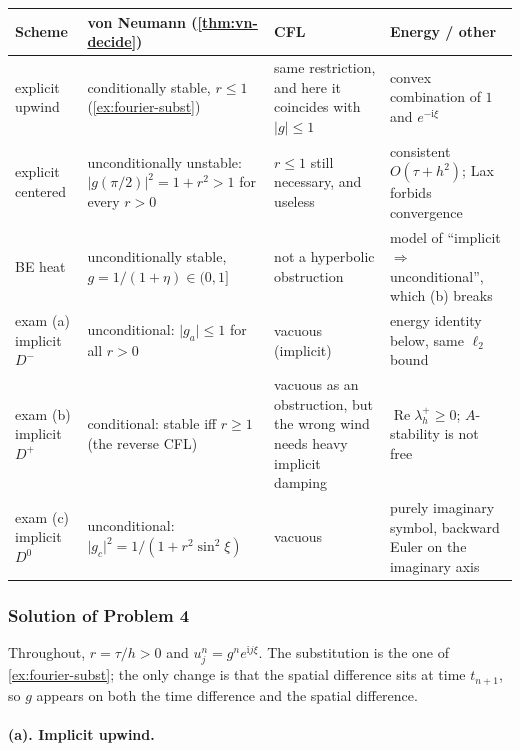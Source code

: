 \documentclass[11pt,a4paper]{article}
\begin{document}
{\footnotesize
\begin{center}
\begin{tabular}{@{}>{\raggedright\arraybackslash}p{3.3cm}
                   >{\raggedright\arraybackslash}p{3.7cm}
                   >{\raggedright\arraybackslash}p{3.5cm}
                   >{\raggedright\arraybackslash}p{3.3cm}@{}}
\toprule
Scheme & von Neumann (\cref{thm:vn-decide}) & CFL & Energy / other \\
\midrule
explicit upwind
&
conditionally stable, \(r\le 1\)
(\cref{ex:fourier-subst})
&
same restriction, and here it coincides with \(\lvert g\rvert\le 1\)
&
convex combination of \(1\) and \(e^{-\mathrm i\xi}\)
\\
explicit centered
&
unconditionally unstable: \(\lvert g(\pi/2)\rvert^2=1+r^2>1\) for every \(r>0\)
&
\(r\le 1\) still necessary, and useless
&
consistent \(O(\tau+h^2)\); Lax forbids convergence
\\
BE heat
&
unconditionally stable, \(g=1/(1+\eta)\in(0,1]\)
&
not a hyperbolic obstruction
&
model of ``implicit \(\Rightarrow\) unconditional'', which (b) breaks
\\
exam (a) implicit \(D^-\)
&
unconditional: \(\lvert g_a\rvert\le 1\) for all \(r>0\)
&
vacuous (implicit)
&
energy identity below, same \(\ell_2\) bound
\\
exam (b) implicit \(D^+\)
&
conditional: stable iff \(r\ge 1\) (the reverse CFL)
&
vacuous as an obstruction, but the wrong wind needs heavy implicit damping
&
\(\operatorname{Re}\lambda_h^+\ge 0\); \(A\)-stability is not free
\\
exam (c) implicit \(D^0\)
&
unconditional: \(\lvert g_c\rvert^2=1/(1+r^2\sin^2\xi)\)
&
vacuous
&
purely imaginary symbol, backward Euler on the imaginary axis
\\
\bottomrule
\end{tabular}
\end{center}
}

\subsubsection{Solution of Problem 4}

Throughout, \(r=\tau/h>0\) and \(u_j^n=g^n e^{\mathrm i j\xi}\). The substitution is the one of \cref{ex:fourier-subst}; the only change is that the spatial difference sits at time \(t_{n+1}\), so \(g\) appears on both the time difference and the spatial difference.

\paragraph{(a). Implicit upwind.}
\end{document}
